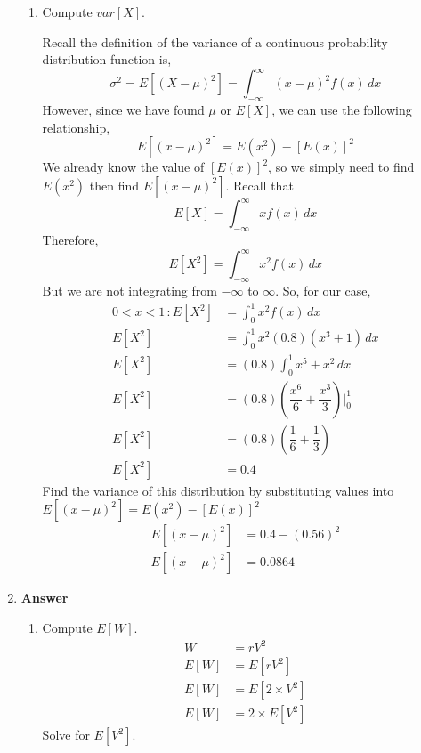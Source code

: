 \documentclass[12pt]{book}
\begin{document}
\begin{enumerate}
\begin{enumerate}
        \item Compute $var[X]$.
        
        Recall the definition of the variance of a continuous probability distribution function is,
        $$\sigma^2 = E\left[(X-\mu)^2\right] = \int_{-\infty}^{\infty}(x-\mu)^2f(x) \, dx$$
        However, since we have found $\mu$ or $E[X]$, we can use the following relationship,
        $$E\left[(x-\mu)^2\right] = E(x^2) - \left[E(x)\right]^2$$
        We already know the value of $\left[E(x)\right]^2$, so we simply need to find $E(x^2)$ then find $E\left[(x-\mu)^2\right]$. Recall that
        $$E[X] = \int_{-\infty}^{\infty} xf(x) \, dx$$
        Therefore,
        $$E[X^2] = \int_{-\infty}^{\infty} x^2f(x) \, dx$$
        But we are not integrating from $-\infty$ to $\infty$. So, for our case,
        \begin{align*}
            0 < x < 1 \, : E[X^2] &= \int_{0}^{1} x^2f(x) \, dx\\
            E[X^2] &= \int_{0}^{1} x^2(0.8)(x^3+1) \, dx\\
            E[X^2] &= (0.8) \int_{0}^{1} x^5+x^2 \, dx\\
            E[X^2] &= (0.8) \left(\dfrac{x^6}{6}+\dfrac{x^3}{3}\right) \Big|_{0}^{1}\\
            E[X^2] &= (0.8) \left(\dfrac{1}{6}+\dfrac{1}{3}\right)\\
            E[X^2] &= 0.4
        \end{align*}
        Find the variance of this distribution by substituting values into $E\left[(x-\mu)^2\right] = E(x^2) - \left[E(x)\right]^2$
        \begin{align*}
            E\left[(x-\mu)^2\right] &= 0.4 - (0.56)^2\\
            E\left[(x-\mu)^2\right] &= 0.0864
        \end{align*}
    \end{enumerate}
    
    \newpage
    
    
    \item \textbf{Answer}
    \begin{enumerate}
        \item Compute $E[W]$.
        \begin{align*}
            W &= rV^2\\
            E[W] &= E[rV^2]\\
            E[W] &= E[2 \times V^2]\\
            E[W] &= 2 \times E[V^2]
        \end{align*}
        Solve for $E[V^2]$.
        

\end{enumerate}
\end{enumerate}
\end{document}
